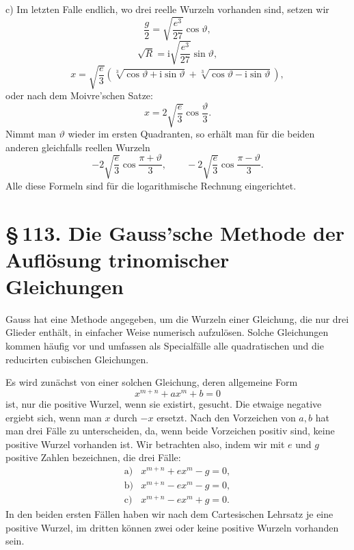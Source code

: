 \documentclass[11pt]{article}
\providecommand{\sect}[2]{\section*{\S\,#1. #2}}
\providecommand{\ii}{\mathrm{i}}
\begin{document}
c) Im letzten Falle endlich, wo drei reelle Wurzeln vorhanden sind, setzen wir
\begin{equation}
        \frac g2=\sqrt{\frac{e^3}{27}}\cos\vartheta,
\tag{10}
\end{equation}
\[
        \sqrt R=\ii\sqrt{\frac{e^3}{27}}\sin\vartheta,
\]
\[
        x=\sqrt{\frac e3}\left(
        \sqrt[3]{\cos\vartheta+\ii\sin\vartheta}
        +\sqrt[3]{\cos\vartheta-\ii\sin\vartheta}\right),
\]
oder nach dem Moivre'schen Satze:
\begin{equation}
        x=2\sqrt{\frac e3}\cos\frac{\vartheta}{3}.
\tag{11}
\end{equation}
Nimmt man $\vartheta$ wieder im ersten Quadranten, so erhält man für die beiden anderen gleichfalls reellen Wurzeln
\[
        -2\sqrt{\frac e3}\cos\frac{\pi+\vartheta}{3},
        \qquad
        -2\sqrt{\frac e3}\cos\frac{\pi-\vartheta}{3}.
\]
Alle diese Formeln sind für die logarithmische Rechnung eingerichtet.

\sect{113}{Die Gauss'sche Methode der Auflösung trinomischer Gleichungen}

Gauss hat eine Methode angegeben, um die Wurzeln einer Gleichung, die nur drei Glieder enthält, in einfacher Weise numerisch aufzulösen. Solche Gleichungen kommen häufig vor und umfassen als Specialfälle alle quadratischen und die reducirten cubischen Gleichungen.

Es wird zunächst von einer solchen Gleichung, deren allgemeine Form
\begin{equation}
        x^{m+n}+ax^m+b=0
\tag{1}
\end{equation}
ist, nur die positive Wurzel, wenn sie existirt, gesucht. Die etwaige negative ergiebt sich, wenn man $x$ durch $-x$ ersetzt. Nach den Vorzeichen von $a,b$ hat man drei Fälle zu unterscheiden, da, wenn beide Vorzeichen positiv sind, keine positive Wurzel vorhanden ist. Wir betrachten also, indem wir mit $e$ und $g$ positive Zahlen bezeichnen, die drei Fälle:
\[
\begin{array}{ll}
\mathrm{a)}&x^{m+n}+ex^m-g=0,\\
\mathrm{b)}&x^{m+n}-ex^m-g=0,\\
\mathrm{c)}&x^{m+n}-ex^m+g=0.
\end{array}
\]
In den beiden ersten Fällen haben wir nach dem Cartesischen Lehrsatz je eine positive Wurzel, im dritten können zwei oder keine positive Wurzeln vorhanden sein.
\end{document}
